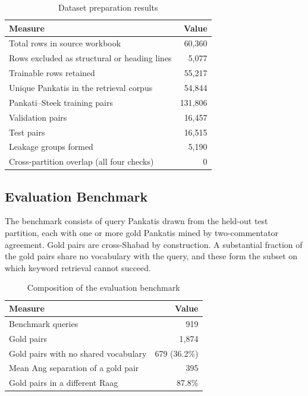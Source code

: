\documentclass[12pt,a4paper]{article}
\begin{document}
\begin{table}[H]
\centering
\renewcommand{\arraystretch}{1.3}
\caption{Dataset preparation results}
\begin{tabular}{|p{7.6cm}|r|}
\hline
\textbf{Measure} & \textbf{Value} \\
\hline
Total rows in source workbook & 60,360 \\
\hline
Rows excluded as structural or heading lines & 5,077 \\
\hline
Trainable rows retained & 55,217 \\
\hline
Unique Pankatis in the retrieval corpus & 54,844 \\
\hline
Pankati--Steek training pairs & 131,806 \\
\hline
Validation pairs & 16,457 \\
\hline
Test pairs & 16,515 \\
\hline
Leakage groups formed & 5,190 \\
\hline
Cross-partition overlap (all four checks) & 0 \\
\hline
\end{tabular}
\end{table}

\subsection{Evaluation Benchmark}

The benchmark consists of query Pankatis drawn from the held-out test partition, each with one or more gold Pankatis mined by two-commentator agreement. Gold pairs are cross-Shabad by construction. A substantial fraction of the gold pairs share no vocabulary with the query, and these form the subset on which keyword retrieval cannot succeed.

\begin{table}[H]
\centering
\renewcommand{\arraystretch}{1.3}
\caption{Composition of the evaluation benchmark}
\begin{tabular}{|p{7.6cm}|r|}
\hline
\textbf{Measure} & \textbf{Value} \\
\hline
Benchmark queries & 919 \\
\hline
Gold pairs & 1,874 \\
\hline
Gold pairs with no shared vocabulary & 679 (36.2\%) \\
\hline
Mean Ang separation of a gold pair & 395 \\
\hline
Gold pairs in a different Raag & 87.8\% \\
\hline
\end{tabular}
\end{table}
\end{document}
